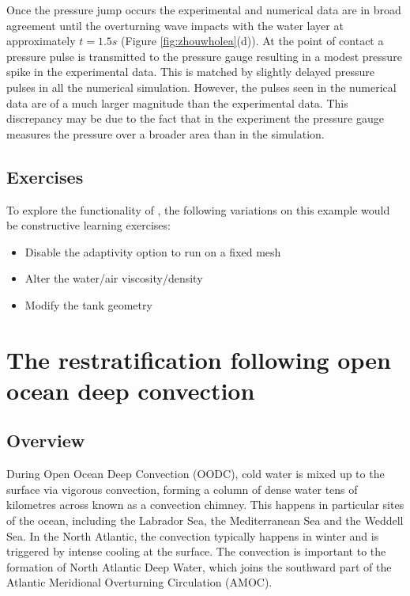 Once the pressure jump occurs the experimental and numerical data are in broad agreement until the overturning wave impacts with the water layer at approximately $t=1.5s$ (Figure \ref{fig:zhouwholea}(d)).  At the point of contact a pressure pulse is transmitted to the pressure gauge resulting in a modest pressure spike in the experimental data.  This is matched by slightly delayed pressure pulses in all the numerical simulation.  However, the pulses seen in the numerical data are of a much larger magnitude than the experimental data. This discrepancy may be due to the fact that in the experiment the pressure gauge measures the pressure over a broader area than in the simulation.

\subsection{Exercises}
To explore the functionality of \fluidity, the following variations on this example would be constructive learning exercises:

\begin{itemize}
\item Disable the adaptivity option to run on a fixed mesh
\item Alter the water/air viscosity/density
\item Modify the tank geometry
\end{itemize}





\section{The restratification following open ocean deep convection}
\label{sec:restratification_after_oodc}

\subsection{Overview}

During Open Ocean Deep Convection (OODC), cold water is mixed up to the surface via vigorous convection, forming a column of dense water tens of kilometres across known as a convection chimney. This happens in particular sites of the ocean, including the Labrador Sea, the Mediterranean Sea and the Weddell Sea.  In the North Atlantic, the convection typically happens in winter and is triggered by intense cooling at the surface. The convection is important to the formation of North Atlantic Deep Water, which joins the southward part of the Atlantic Meridional Overturning Circulation (AMOC).

